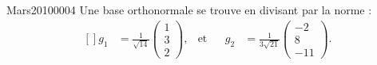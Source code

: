 \begin{corrige}{Mars20100004}
	Une base orthonormale se trouve en divisant par la norme :
	\begin{equation}
		\begin{aligned}[]
			g_1&=\frac{1}{ \sqrt{14} }\begin{pmatrix}
				1	\\ 
				3	\\ 
				2	
			\end{pmatrix},&\text{et}&
			&g_2&=\frac{1}{ 3\sqrt{21} }\begin{pmatrix}
				-2	\\ 
				8	\\ 
				-11	
			\end{pmatrix}.
		\end{aligned}
	\end{equation}


	

\end{corrige}
